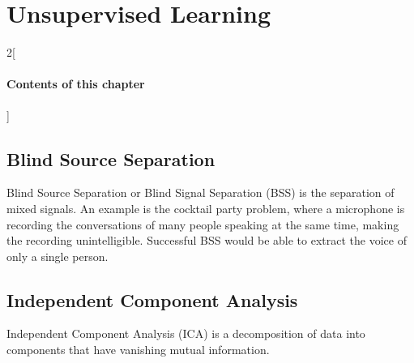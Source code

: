 \chapter{Unsupervised Learning}

\begin{multicols}{2}[\subsubsection*{Contents of this chapter}]
\end{multicols}

\section{Blind Source Separation}
Blind Source Separation or Blind Signal Separation (BSS) is the separation of mixed signals. An example is the cocktail party problem, where a microphone is recording the conversations of many people speaking at the same time, making the recording unintelligible. Successful BSS would be able to extract the voice of only a single person.  

\section{Independent Component Analysis}
Independent Component Analysis (ICA) is a decomposition of data into components that have vanishing mutual information. 





\chapauthor{}	